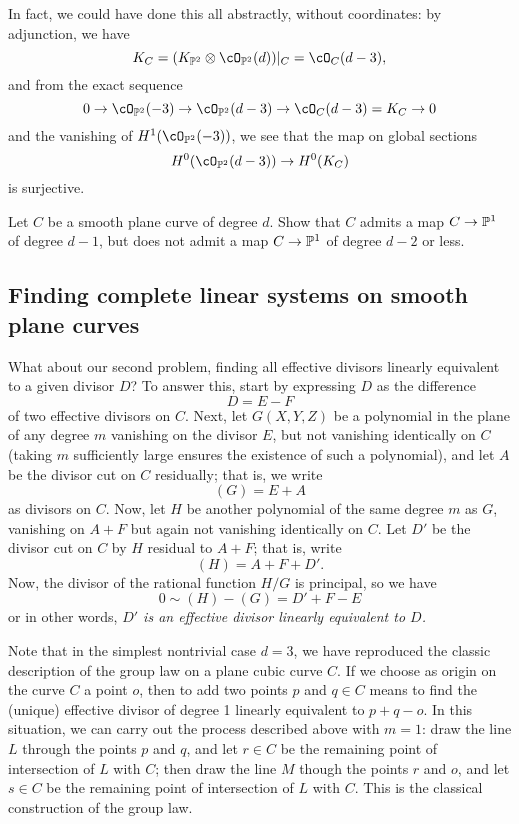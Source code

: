 In fact, we could have done this all abstractly, without coordinates: by adjunction, we have
$$
K_C = (K_{\PP^2} \otimes \cO_{\PP^2}(d))|_C = \cO_C(d-3),
$$
and from the exact sequence
$$
0 \to \cO_{\PP^2}(-3) \to \cO_{\PP^2}(d-3) \to \cO_C(d-3)=K_C \to 0
$$
and the vanishing of $H^1(\cO_{\PP^2}(-3))$, we see that the map on global sections
$$
H^0(\cO_{\PP^2}(d-3)) \to H^0(K_C)
$$
is surjective. 

\begin{exercise}\label{gonality of smooth plane curve}
Let $C$ be a smooth plane curve of degree $d$. Show that $C$ admits a map $C \to \PP^1$ of degree $d-1$, but does not admit a map $C \to \PP^1$ of degree $d-2$ or less.
\end{exercise}


\subsection{Finding complete linear systems on smooth plane curves}

What about our second problem, finding all effective divisors linearly equivalent to a given divisor $D$? To answer this, start by expressing $D$ as the difference 
$$
D = E - F
$$
of two effective divisors on $C$. Next, let $G(X,Y,Z)$ be a polynomial in the plane of any degree $m$ vanishing on the divisor $E$, but not vanishing identically on $C$ (taking $m$ sufficiently large ensures the existence of such a polynomial), and let $A$ be the divisor cut on $C$ residually; that is, we write
$$
(G) = E + A
$$
as divisors on $C$. Now, let $H$ be another polynomial of the same degree $m$ as $G$, vanishing on $A + F$ but again not vanishing identically on $C$. Let $D'$ be the divisor cut on $C$ by $H$ residual to $A+F$; that is, write
$$
(H) = A + F + D'.
$$
Now, the divisor of the rational function $H/G$ is principal, so we have
$$
0 \sim (H) - (G) = D' + F - E
$$
or in other words, \emph{$D'$ is an effective divisor linearly equivalent to $D$.}

Note that in the simplest nontrivial case $d=3$, we have reproduced the classic description of the group law on a plane cubic curve $C$. If we choose as origin on the curve $C$ a point $o$, then to add two points $p$ and $q \in C$ means to find the (unique) effective divisor of degree 1 linearly equivalent to $p + q - o$. In this situation, we can carry out the process described above with $m=1$: draw the line $L$ through the points $p$ and $q$, and let $r \in C$ be the remaining point of intersection of $L$ with $C$; then draw the line $M$ though the points $r$ and $o$, and let $s \in C$ be the remaining point of intersection of $L$ with $C$. This is the classical construction of the group law.

